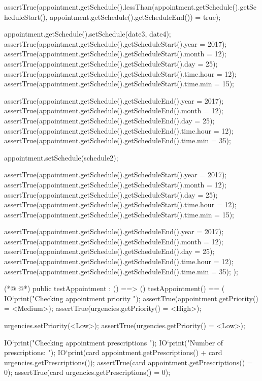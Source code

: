 \begin{vdmpp}[breaklines=true]
   assertTrue(appointment.getSchedule().lessThan(appointment.getSchedule().getScheduleStart(), appointment.getSchedule().getScheduleEnd()) = true);
   
   appointment.getSchedule().setSchedule(date3, date4);
   assertTrue(appointment.getSchedule().getScheduleStart().year = 2017);
   assertTrue(appointment.getSchedule().getScheduleStart().month = 12);
   assertTrue(appointment.getSchedule().getScheduleStart().day = 25);
   assertTrue(appointment.getSchedule().getScheduleStart().time.hour = 12);
   assertTrue(appointment.getSchedule().getScheduleStart().time.min = 15);
   
   assertTrue(appointment.getSchedule().getScheduleEnd().year = 2017);
   assertTrue(appointment.getSchedule().getScheduleEnd().month = 12);
   assertTrue(appointment.getSchedule().getScheduleEnd().day = 25);
   assertTrue(appointment.getSchedule().getScheduleEnd().time.hour = 12);
   assertTrue(appointment.getSchedule().getScheduleEnd().time.min = 35);
   
   appointment.setSchedule(schedule2);
   
   assertTrue(appointment.getSchedule().getScheduleStart().year = 2017);
   assertTrue(appointment.getSchedule().getScheduleStart().month = 12);
   assertTrue(appointment.getSchedule().getScheduleStart().day = 25);
   assertTrue(appointment.getSchedule().getScheduleStart().time.hour = 12);
   assertTrue(appointment.getSchedule().getScheduleStart().time.min = 15);
   
   assertTrue(appointment.getSchedule().getScheduleEnd().year = 2017);
   assertTrue(appointment.getSchedule().getScheduleEnd().month = 12);
   assertTrue(appointment.getSchedule().getScheduleEnd().day = 25);
   assertTrue(appointment.getSchedule().getScheduleEnd().time.hour = 12);
   assertTrue(appointment.getSchedule().getScheduleEnd().time.min = 35);
  );
  
(*@
\label{testAppointment:173}
@*)
 public testAppointment : () ==> ()
  testAppointment() == (
   IO`print("\n Checking appointment priority \n");
   assertTrue(appointment.getPriority() = <Medium>);
   assertTrue(urgencies.getPriority() = <High>);
   
   urgencies.setPriority(<Low>);
   assertTrue(urgencies.getPriority() = <Low>);
   
   IO`print("\n Checking appointment prescriptions \n");
   IO`print("\n Number of prescriptions: ");
   IO`print(card appointment.getPrescriptions() + card urgencies.getPrescriptions());
   assertTrue(card appointment.getPrescriptions() = 0);
   assertTrue(card urgencies.getPrescriptions() = 0);
   

\end{vdmpp}
